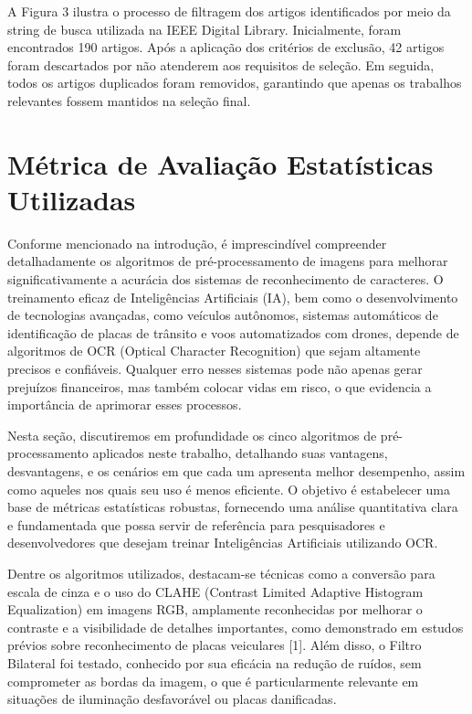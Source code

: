 \documentclass[conference]{IEEEtran}
\begin{document}
A Figura 3 ilustra o processo de filtragem dos artigos identificados por meio da string de busca utilizada na IEEE Digital Library. Inicialmente, foram encontrados 190 artigos. Após a aplicação dos critérios de exclusão, 42 artigos foram descartados por não atenderem aos requisitos de seleção. Em seguida, todos os artigos duplicados foram removidos, garantindo que apenas os trabalhos relevantes fossem mantidos na seleção final.

\section{Métrica de Avaliação Estatísticas Utilizadas}

Conforme mencionado na introdução, é imprescindível compreender detalhadamente os algoritmos de pré-processamento de imagens para melhorar significativamente a acurácia dos sistemas de reconhecimento de caracteres. O treinamento eficaz de Inteligências Artificiais (IA), bem como o desenvolvimento de tecnologias avançadas, como veículos autônomos, sistemas automáticos de identificação de placas de trânsito e voos automatizados com drones, depende de algoritmos de OCR (Optical Character Recognition) que sejam altamente precisos e confiáveis. Qualquer erro nesses sistemas pode não apenas gerar prejuízos financeiros, mas também colocar vidas em risco, o que evidencia a importância de aprimorar esses processos.

Nesta seção, discutiremos em profundidade os cinco algoritmos de pré-processamento aplicados neste trabalho, detalhando suas vantagens, desvantagens, e os cenários em que cada um apresenta melhor desempenho, assim como aqueles nos quais seu uso é menos eficiente. O objetivo é estabelecer uma base de métricas estatísticas robustas, fornecendo uma análise quantitativa clara e fundamentada que possa servir de referência para pesquisadores e desenvolvedores que desejam treinar Inteligências Artificiais utilizando OCR.

Dentre os algoritmos utilizados, destacam-se técnicas como a conversão para escala de cinza e o uso do CLAHE (Contrast Limited Adaptive Histogram Equalization) em imagens RGB, amplamente reconhecidas por melhorar o contraste e a visibilidade de detalhes importantes, como demonstrado em estudos prévios sobre reconhecimento de placas veiculares [1]. Além disso, o Filtro Bilateral foi testado, conhecido por sua eficácia na redução de ruídos, sem comprometer as bordas da imagem, o que é particularmente relevante em situações de iluminação desfavorável ou placas danificadas.
\end{document}
